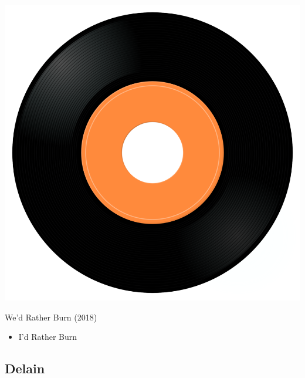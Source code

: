 \begin{minipage}[t]{0.25\textwidth}
\captionsetup{type=figure}
\includegraphics[width=\textwidth]{Images/cover.png}
\caption*{We'd Rather Burn (2018)}
\end{minipage}
\begin{minipage}[t]{0.25\textwidth}\vspace{0pt}
\begin{itemize}[nosep,leftmargin=1em,labelwidth=*,align=left]
	\setlength{\itemsep}{0pt}
	\item I'd Rather Burn
\end{itemize}
\end{minipage}

\subsection{Delain}

